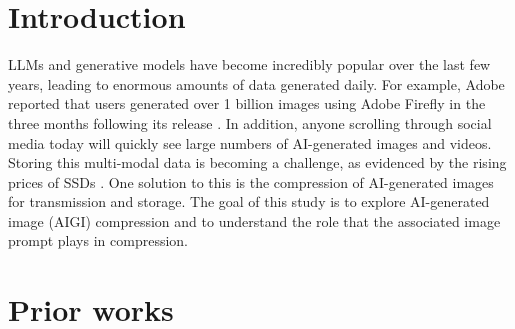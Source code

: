 \begin{abstract}

Due to the massive increase in AI-generated data in recent years, storage and transmission of AI-generated images is a more pressing problem. One solution is image compression that is specific to AI-generated images. This project reconstructs CATC, an image compression model for AI-generated images, and performs a prompt ablation study to understand to what extent prompt information improves AIGI compression. The findings are that altering the prompt does reduce image compression quality by a statistically significant amount, but this reduction is incredibly small (less than 0.1 dB). 

\end{abstract}


\section{Introduction}
LLMs and generative models have become incredibly popular over the last few years, leading to enormous amounts of data generated daily. For example, Adobe reported that users generated over 1 billion images using Adobe Firefly in the three months following its release \cite{fu2023adobe}. In addition, anyone scrolling through social media today will quickly see large numbers of AI-generated images and videos. Storing this multi-modal data is becoming a challenge, as evidenced by the rising prices of SSDs \cite{kinghorn2026ssd}. One solution to this is the compression of AI-generated images for transmission and storage. The goal of this study is to explore AI-generated image (AIGI) compression and to understand the role that the associated image prompt plays in compression.

\section{Prior works}

